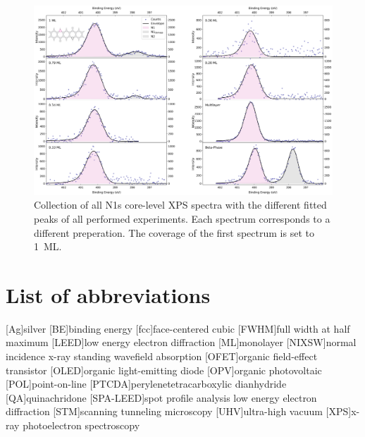 \begin{figure}[H]
	\centering
	\includegraphics[height=0.9\textwidth,  angle=90]{images/N1s-all.png}
	\caption{Collection of all N1s core-level \ac{XPS} spectra with the different fitted peaks of all performed experiments. Each spectrum corresponds to a different preperation. The coverage of the first spectrum is set to 1~\ac{ML}.}
	\label{fig:N1s-stacked}
\end{figure}


\newpage
\section*{List of abbreviations}

\begin{acronym}
    [Ag]{silver}
    [BE]{binding energy}
    [fcc]{face-centered cubic}
    [FWHM]{full width at half maximum}
    [LEED]{low energy electron diffraction}
    [ML]{monolayer}
    [NIXSW]{normal incidence x-ray standing wavefield absorption}
    [OFET]{organic field-effect transistor}
    [OLED]{organic light-emitting diode}
    [OPV]{organic photovoltaic}
    [POL]{point-on-line}
    [PTCDA]{perylenetetracarboxylic dianhydride}
    [QA]{quinachridone}
    [SPA-LEED]{spot profile analysis low energy electron diffraction}
    [STM]{scanning tunneling microscopy}
    [UHV]{ultra-high vacuum}
    [XPS]{x-ray photoelectron spectroscopy}
\end{acronym}




